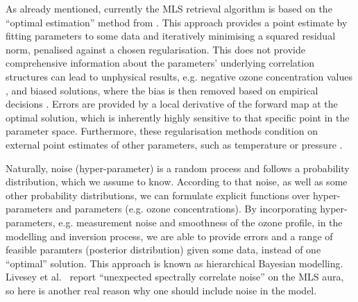 As already mentioned, currently the MLS retrieval algorithm \cite{livesey2006retrieval} is based on the ``optimal estimation'' method from \cite{rodgers1976retrieval}.
This approach provides a point estimate by fitting parameters to some data and iteratively minimising a squared residual norm, penalised against a chosen regularisation.
This does not provide comprehensive information about the parameters' underlying correlation structures can lead to unphysical results, e.g. negative ozone concentration values \cite{MLSdata}, and biased solutions, where the bias is then removed based on empirical decisions \cite{livesey2008ozonecarbonmono, Froidevaux2008snrozone}.
Errors are provided by a local derivative of the forward map at the optimal solution, which is inherently highly sensitive to that specific point in the parameter space.
Furthermore, these regularisation methods condition on external point estimates of other parameters, such as temperature or pressure \cite{livesey2006retrieval}.

Naturally, noise (hyper-parameter) is a random process and follows a probability distribution, which we assume to know.
According to that noise, as well as some other probability distributions, we can formulate explicit functions over hyper-parameters and parameters (e.g. ozone concentrations).
By incorporating hyper-parameters, e.g. measurement noise and smoothness of the ozone profile, in the modelling and inversion process, we are able to provide errors and a range of feasible paramters (posterior distribution) given some data, instead of one ``optimal'' solution.
This approach is known as hierarchical Bayesian modelling.
Livesey et al.~\cite{livesey2006retrieval} report ``unexpected spectrally correlate noise'' on the MLS aura, so here is another real reason why one should include noise in the model.

